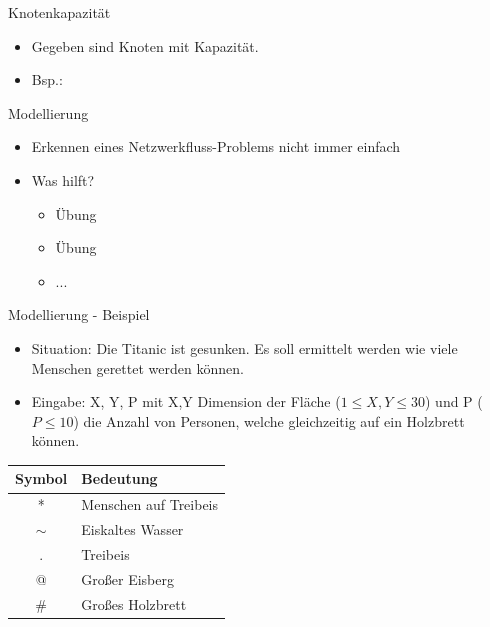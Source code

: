 \documentclass[18pt]{beamer}
\begin{document}
\begin{frame}{Knotenkapazit\"at}
\begin{itemize}
\item Gegeben sind Knoten mit Kapazit\"at.
\item Bsp.:
\end{itemize}
\begin{center}
\end{center}
\end{frame}

\begin{frame}{Modellierung}
\begin{itemize}
\item Erkennen eines Netzwerkfluss-Problems nicht immer einfach
\pause
\item Was hilft?
\begin{itemize}
\pause
\item \"Ubung
\item \"Ubung
\item ...
\end{itemize}
\end{itemize}
\end{frame}

\begin{frame}{Modellierung - Beispiel}
\begin{itemize}
\item Situation: Die Titanic ist gesunken. Es soll ermittelt werden wie viele Menschen gerettet werden k\"onnen.
\item Eingabe: X, Y, P mit X,Y Dimension der Fl\"ache (\(1 \leq X,Y \leq 30\)) und P (\(P \leq 10\)) die Anzahl von Personen, welche gleichzeitig auf ein Holzbrett k\"onnen.
\end{itemize}
\begin{center}
\begin{tabular}{c|l}
Symbol & Bedeutung \\
\hline
* & Menschen auf Treibeis \\
\(\sim\) & Eiskaltes Wasser \\
. & Treibeis \\
@ & Gro\ss er Eisberg \\
\# & Gro\ss es Holzbrett \\
\end{tabular}
\end{center}
\end{frame}
\end{document}

